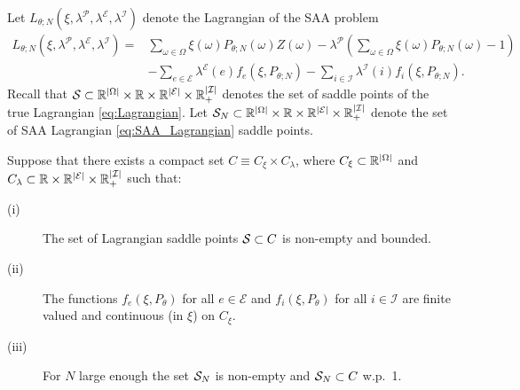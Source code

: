 Let $L_{\theta;N}(\xi,\lambda^{\mathcal P},\lambda^{\mathcal E},\lambda^{\mathcal I})$ denote the Lagrangian of the SAA problem
\begin{equation}\label{eq:SAA_Lagrangian}
\begin{split}
L_{\theta;N}(\xi,\lambda^{\mathcal P},\lambda^{\mathcal E},\lambda^{\mathcal I})=&\sum_{\omega \in \Omega} \!\! \xi(\omega) P_{\theta;N}(\omega) Z(\omega)\!-\!\lambda^{\mathcal P}\left(\sum_{\omega \in \Omega}\xi(\omega)P_{\theta;N}(\omega)\!-\!1\!\right)\\
&-\sum_{e\in\mathcal E}\lambda^{\mathcal E}(e) f_e(\xi,P_{\theta;N})-\sum_{i\in\mathcal I}\lambda^{\mathcal I}(i) f_i(\xi,P_{\theta;N}).
\end{split}
\end{equation}
Recall that $\mathcal S \subset {\mathbb{R}}^{|\Omega|}\times {\mathbb{R}}\times {\mathbb{R}}^{|\mathcal E|}\times {\mathbb{R}}^{|\mathcal I|}_{+}$ denotes the set of saddle points of the true Lagrangian \eqref{eq:Lagrangian}.
Let $\mathcal S_{N}\subset {\mathbb{R}}^{|\Omega|}\times {\mathbb{R}}\times {\mathbb{R}}^{|\mathcal E|}\times {\mathbb{R}}^{|\mathcal I|}_{+}$ denote the set of SAA Lagrangian \eqref{eq:SAA_Lagrangian} saddle points.

Suppose that there exists a compact set $C \equiv C_\xi \times C_\lambda$, where $C_\xi \subset {\mathbb{R}}^{|\Omega|}$ and $C_\lambda \subset {\mathbb{R}}\times {\mathbb{R}}^{|\mathcal E|}\times {\mathbb{R}}^{|\mathcal I|}_{+}$ such that:
\begin{description}
\item[(i)] The set of Lagrangian saddle points $\mathcal S \subset C$ is non-empty and bounded.
\item[(ii)] The functions $f_e(\xi,P_\theta)$ for all $e\in\mathcal E$ and $f_i(\xi,P_\theta)$ for all $i\in\mathcal I$ are finite valued and continuous (in $\xi$) on $C_\xi$.
\item[(iii)] For $N$ large enough the set $\mathcal S_{N}$ is non-empty and $\mathcal S_{N} \subset C$ w.p.~1.
\end{description}

